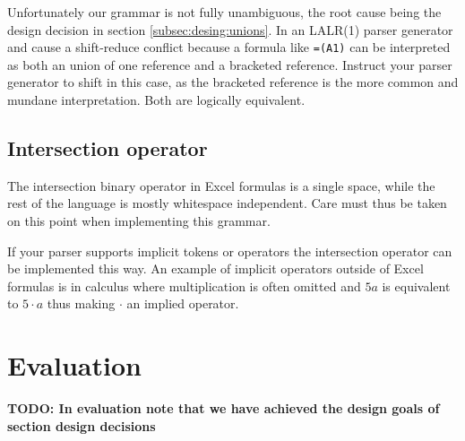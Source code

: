 \documentclass[conference]{IEEEtran}
\newcommand{\todo}[1]{\textbf{TODO: #1}}
\begin{document}
Unfortunately our grammar is not fully unambiguous, the root cause being the design decision in section \ref{subsec:desing:unions}.
In an LALR(1) parser generator  and  cause a shift-reduce conflict because a formula like \texttt{=(A1)} can be interpreted as both an union of one reference and a bracketed reference.
Instruct your parser generator to shift in this case, as the bracketed reference is the more common and mundane interpretation.
Both are logically equivalent.





\subsection{Intersection operator}

The intersection binary operator in Excel formulas is a single space, while the rest of the language is mostly whitespace independent.
Care must thus be taken on this point when implementing this grammar.

If your parser supports implicit tokens or operators the intersection operator can be implemented this way.
An example of implicit operators outside of Excel formulas is in calculus where multiplication is often omitted and $5a$ is equivalent to $5 \cdot a$ thus making $\cdot$ an implied operator.


\section{Evaluation}

\todo{In evaluation note that we have achieved the design goals of section design decisions}
\end{document}
